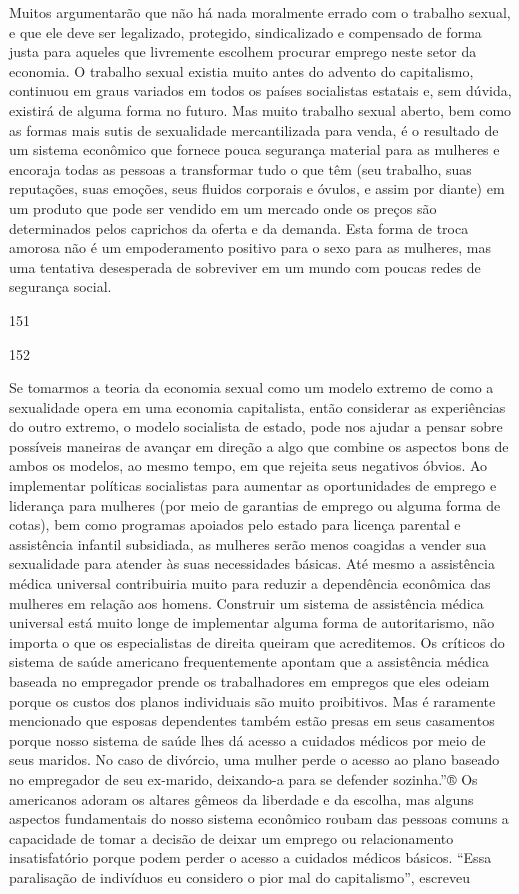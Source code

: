  \par 
Muitos argumentarão que não há nada moralmente errado com o trabalho sexual, e que ele deve ser legalizado, protegido, sindicalizado e compensado de forma justa para aqueles que livremente escolhem procurar emprego neste setor da economia. O trabalho sexual existia muito antes do advento do capitalismo, continuou em graus variados em todos os países socialistas estatais e, sem dúvida, existirá de alguma forma no futuro. Mas muito trabalho sexual aberto, bem como as formas mais sutis de sexualidade mercantilizada para venda, é o resultado de um sistema econômico que fornece pouca segurança material para as mulheres e encoraja todas as pessoas a transformar tudo o que têm (seu trabalho, suas reputações, suas emoções, seus fluidos corporais e óvulos, e assim por diante) em um produto que pode ser vendido em um mercado onde os preços são determinados pelos caprichos da oferta e da demanda. Esta forma de troca amorosa não é um empoderamento positivo para o sexo para as mulheres, mas uma tentativa desesperada de sobreviver em um mundo com poucas redes de segurança social.
 \par 
151
 \par 
152
 \par 
Se tomarmos a teoria da economia sexual como um modelo extremo de como a sexualidade opera em uma economia capitalista, então considerar as experiências do outro extremo, o modelo socialista de estado, pode nos ajudar a pensar sobre possíveis maneiras de avançar em direção a algo que combine os aspectos bons de ambos os modelos, ao mesmo tempo, em que rejeita seus negativos óbvios. Ao implementar políticas socialistas para aumentar as oportunidades de emprego e liderança para mulheres (por meio de garantias de emprego ou alguma forma de cotas), bem como programas apoiados pelo estado para licença parental e assistência infantil subsidiada, as mulheres serão menos coagidas a vender sua sexualidade para atender às suas necessidades básicas. Até mesmo a assistência médica universal contribuiria muito para reduzir a dependência econômica das mulheres em relação aos homens. Construir um sistema de assistência médica universal está muito longe de implementar alguma forma de autoritarismo, não importa o que os especialistas de direita queiram que acreditemos. Os críticos do sistema de saúde americano frequentemente apontam que a assistência médica baseada no empregador prende os trabalhadores em empregos que eles odeiam porque os custos dos planos individuais são muito proibitivos. Mas é raramente mencionado que esposas dependentes também estão presas em seus casamentos porque nosso sistema de saúde lhes dá acesso a cuidados médicos por meio de seus maridos. No caso de divórcio, uma mulher perde o acesso ao plano baseado no empregador de seu ex-marido, deixando-a para se defender sozinha.”® Os americanos adoram os altares gêmeos da liberdade e da escolha, mas alguns aspectos fundamentais do nosso sistema econômico roubam das pessoas comuns a capacidade de tomar a decisão de deixar um emprego ou relacionamento insatisfatório porque podem perder o acesso a cuidados médicos básicos. “Essa paralisação de indivíduos eu considero o pior mal do capitalismo”, escreveu
